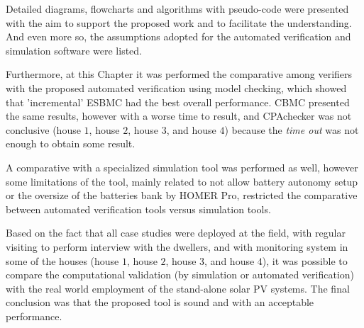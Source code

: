 Detailed diagrams, flowcharts and algorithms with pseudo-code were presented with the aim to support the proposed work and to facilitate the understanding. And even more so, the assumptions adopted for the automated verification and simulation software were listed.

Furthermore, at this Chapter it was performed the comparative among verifiers with the proposed automated verification using model checking, which showed that 'incremental' ESBMC had the best overall performance. CBMC presented the same results, however with a worse time to result, and CPAchecker was not conclusive (house $1$, house $2$, house $3$, and house $4$) because the \textit{time out} was not enough to obtain some result.

A comparative with a specialized simulation tool was performed as well, however some limitations of the tool, mainly related to not allow battery autonomy setup or the oversize of the batteries bank by HOMER Pro, restricted the comparative between automated verification tools versus simulation tools.

Based on the fact that all case studies were deployed at the field, with regular visiting to perform interview with the dwellers, and with monitoring system in some of the houses (house $1$, house $2$, house $3$, and house $4$), it was possible to compare the computational validation (by simulation or automated verification) with the real world employment of the stand-alone solar PV systems. The final conclusion was that the proposed tool is sound and with an acceptable performance. 
